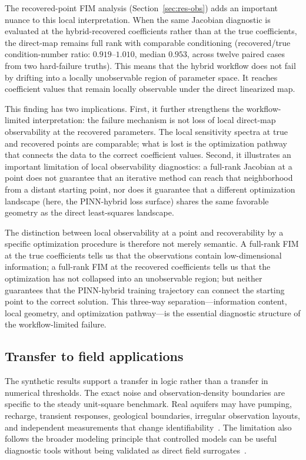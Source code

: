 \documentclass[pdflatex,sn-mathphys,Numbered,iicol]{sn-jnl}
\begin{document}
The recovered-point FIM analysis (Section~\ref{sec:res-obs}) adds an
important nuance to this local interpretation. When the same Jacobian
diagnostic is evaluated at the hybrid-recovered coefficients rather than at
the true coefficients, the direct-map remains full rank with comparable
conditioning (recovered/true condition-number ratio: $0.919$--$1.010$,
median $0.953$, across twelve paired cases from two hard-failure truths).
This means that the hybrid workflow does not fail by drifting into a locally
unobservable region of parameter space. It reaches coefficient values that
remain locally observable under the direct linearized map.

This finding has two implications. First, it further strengthens the
workflow-limited interpretation: the failure mechanism is not loss of local
direct-map observability at the recovered parameters. The local sensitivity
spectra at true and recovered points are comparable; what is lost is the optimization pathway
that connects the data to the correct coefficient values. Second, it
illustrates an important limitation of local observability diagnostics: a
full-rank Jacobian at a point does not guarantee that an iterative method can
reach that neighborhood from a distant starting point, nor does it guarantee
that a different optimization landscape (here, the PINN-hybrid loss surface)
shares the same favorable geometry as the direct least-squares landscape.

The distinction between local observability at a point and recoverability by a
specific optimization procedure is therefore not merely semantic. A full-rank
FIM at the true coefficients tells us that the observations contain
low-dimensional information; a full-rank FIM at the recovered coefficients
tells us that the optimization has not collapsed into an unobservable region;
but neither guarantees that the PINN-hybrid training trajectory can connect the
starting point to the correct solution. This three-way
separation---information content, local geometry, and optimization
pathway---is the essential diagnostic structure of the workflow-limited
failure.

\subsection{Transfer to field applications}
\label{sec:disc-transfer}

The synthetic results support a transfer in logic rather than a transfer in
numerical thresholds. The exact noise and observation-density boundaries are
specific to the steady unit-square benchmark. Real aquifers may have pumping,
recharge, transient responses, geological boundaries, irregular observation
layouts, and independent measurements that change
identifiability~\cite{yeh2015flow, cardiff2013hydraulic}. The limitation also
follows the broader modeling principle that controlled models can be useful
diagnostic tools without being validated as direct field
surrogates~\cite{konikow1992validation}.
\end{document}
